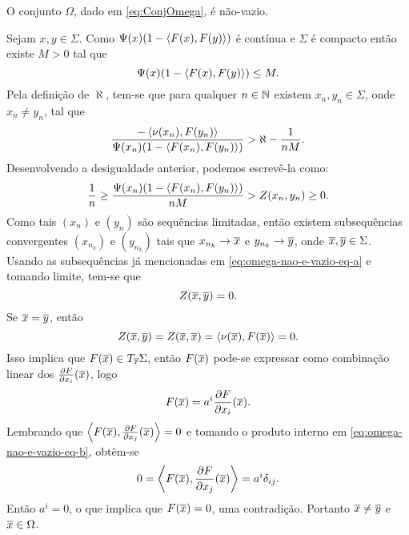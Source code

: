\begin{lema}
O conjunto $\Omega$, dado em \eqref{eq:ConjOmega}, \'e n\~ao-vazio.
\end{lema}

\begin{demonstracao}
	Sejam $x,y \in \Sigma$. Como
	$\Psi(x) (1 - \left\langle F(x),F(y) \right\rangle)$ é contínua e
	$\Sigma$ é compacto então existe $M > 0$ tal que
	\begin{equation*}
	\Psi(x) (1 - \left\langle F(x),F(y) \right\rangle) \leq M.
	\end{equation*}
	Pela definição de $\aleph$, tem-se
	que para qualquer $n \in \mathbb{N}$ existem $x_n,y_n \in \Sigma$, onde $x_n \neq y_n$, tal que
	\begin{equation*}
	\frac{- \left\langle \nu(x_n),F(y_n) \right\rangle}{\Psi(x_n) (1 - \left\langle F(x_n),F(y_n) \right\rangle)} > \aleph - \frac{1}{nM}.
	\end{equation*}
	Desenvolvendo a desigualdade anterior, podemos escrevê-la como:
	\begin{equation}\label{eq:omega-nao-e-vazio-eq-a}
	\frac{1}{n} \geq \frac{\Psi(x_n) (1 - \left\langle F(x_n),F(y_n) \right\rangle)}{nM} > Z(x_n,y_n) \geq 0.
	\end{equation}
	Como tais $(x_n)$ e $(y_n)$ são sequências limitadas, então existem subsequências convergentes $(x_{n_k})$ e $(y_{n_k})$ tais que
	$x_{n_k} \rightarrow \overline{x}$ e
	$y_{n_k} \rightarrow \overline{y}$,
	onde $\overline{x}, \overline{y} \in \Sigma$.
	Usando as subsequências já mencionadas em \eqref{eq:omega-nao-e-vazio-eq-a} e tomando limite, tem-se que
	\begin{equation*}
	Z(\overline{x},\overline{y}) = 0.
	\end{equation*}
	Se $\overline{x} = \overline{y}$, então
	\begin{equation*}
	Z(\overline{x},\overline{y}) = Z(\overline{x}, \overline{x}) = \left\langle \nu(\overline{x}),F(\overline{x}) \right\rangle = 0.
	\end{equation*}
	Isso implica que 
	$F(\overline{x}) \in T_{\overline{x}} \Sigma$,
	então $F(\overline{x})$ pode-se expressar como combinação linear dos $\frac{\partial F}{\partial x_i}(\overline{x})$, logo
	\begin{equation}\label{eq:omega-nao-e-vazio-eq-b}
	F(\overline{x}) = a^i \frac{\partial F}{\partial x_i}(\overline{x}).
	\end{equation}
	Lembrando que
	$\left\langle F(\overline{x}),\frac{\partial F}{\partial x_j}(\overline{x}) \right\rangle = 0$
	e tomando o produto interno em \eqref{eq:omega-nao-e-vazio-eq-b}, obtêm-se
	\begin{equation*}
	0 = \left\langle F(\overline{x}),\frac{\partial F}{\partial x_j}(\overline{x}) \right\rangle = a^i \delta_{ij}.
	\end{equation*}
	Então
	$a^i = 0$,
	o que implica que
	$F(\overline{x}) = 0$, uma contradição.
	Portanto
	$\overline{x} \neq \overline{y}$ e
	$\overline{x} \in \Omega$.
\end{demonstracao}

